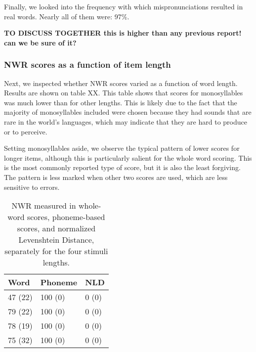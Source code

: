 \documentclass[english,,man,floatsintext]{apa6}
\begin{document}
Finally, we looked into the frequency with which mispronunciations resulted in real words. Nearly all of them were: 97\%.

\textbf{TO DISCUSS TOGETHER this is higher than any previous report! can we be sure of it?}

\hypertarget{nwr-scores-as-a-function-of-item-length}{%
\subsubsection{NWR scores as a function of item length}\label{nwr-scores-as-a-function-of-item-length}}

Next, we inspected whether NWR scores varied as a function of word length. Results are shown on table XX. This table shows that scores for monosyllables was much lower than for other lengths. This is likely due to the fact that the majority of monosyllables included were chosen because they had sounds that are rare in the world's languages, which may indicate that they are hard to produce or to perceive.

Setting monosyllables aside, we observe the typical pattern of lower scores for longer items, although this is particularly salient for the whole word scoring. This is the most commonly reported type of score, but it is also the least forgiving. The pattern is less marked when other two scores are used, which are less sensitive to errors.

\begin{table}[tbp]

\begin{center}
\begin{threeparttable}

\caption{\label{tab:tablength}NWR measured in whole-word scores, phoneme-based scores, and normalized Levenshtein Distance, separately for the four stimuli lengths.}

\begin{tabular}{lll}
\toprule
Word & \multicolumn{1}{c}{Phoneme} & \multicolumn{1}{c}{NLD}\\
\midrule
47 (22) & 100 (0) & 0 (0)\\
79 (22) & 100 (0) & 0 (0)\\
78 (19) & 100 (0) & 0 (0)\\
75 (32) & 100 (0) & 0 (0)\\
\bottomrule
\end{tabular}

\end{threeparttable}
\end{center}

\end{table}
\end{document}
